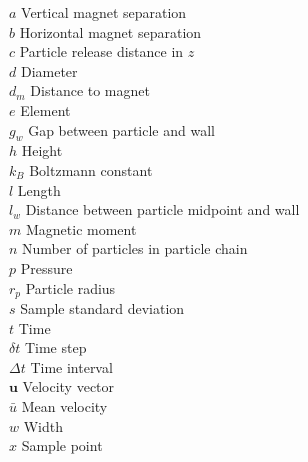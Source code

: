 \begin{tabbing}
 $a$ \> Vertical magnet separation \> [m] \\[0.5ex]
 $b$ \> Horizontal magnet separation \> [m] \\[0.5ex]
 $c$ \> Particle release distance in $z$ \> [m] \\[0.5ex]
 $d$ \> Diameter \> [m] \\[0.5ex]
 $d_{m}$ \> Distance to magnet \> [m] \\[0.5ex]
 $e$ \> Element \> [$-$] \\[0.5ex]
 $g_{w}$ \> Gap between particle and wall \> [m] \\[0.5ex]
 $h$ \> Height \> [m] \\[0.5ex]
 $k_{B}$ \> Boltzmann constant  \\[0.5ex] 
 $l$ \> Length \> [m] \\[0.5ex] 
 $l_{w}$ \> Distance between particle midpoint and wall \> [m] \\[0.5ex] 
 $m$ \> Magnetic moment \> [A$\cdot$m$^{2}$] \\[0.5ex]
 $n$ \> Number of particles in particle chain \> [$-$] \\[0.5ex]
 $p$ \> Pressure \> [N/m$^{2}$] \\[0.5ex]
 $r_{p}$ \> Particle radius \> [m] \\[0.5ex]
 $s$ \> Sample standard deviation \> [$\ast$] \\[0.5ex]
 $t$ \> Time \> [s] \\[0.5ex]
 $\delta t$ \> Time step \> [s] \\[0.5ex]
 $\Delta t$ \> Time interval \> [s] \\[0.5ex] 
 $\mathbf{u}$ \> Velocity vector \> [m/s] \\[0.5ex]
 $\bar{u}$ \> Mean velocity \> [m/s] \\[0.5ex]
 $w$ \> Width \> [m] \\[0.5ex]
 $x$ \> Sample point \> [$\ast$] \\[0.5ex]


\end{tabbing}
